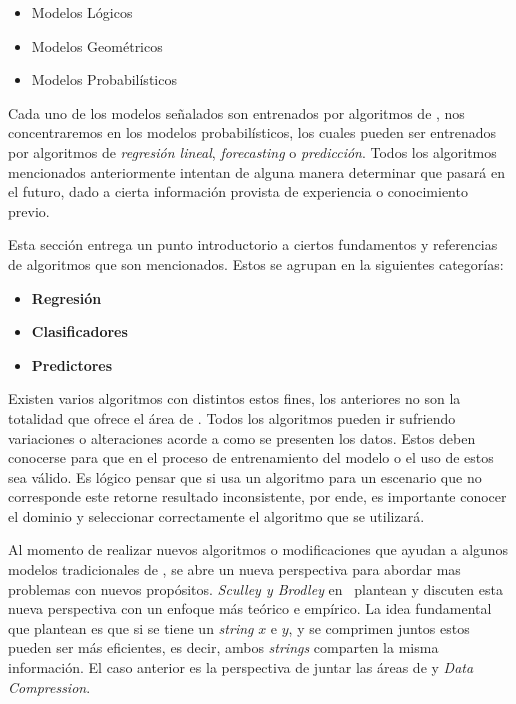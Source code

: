 \begin{itemize}
\menorEspacioItemize		
 \item Modelos Lógicos
 \item Modelos Geométricos
 \item Modelos Probabilísticos
\end{itemize} 

Cada uno de los modelos señalados son entrenados por algoritmos de \machinelearning, nos concentraremos en los modelos probabilísticos, los cuales pueden ser entrenados por algoritmos de \emph{regresión lineal}, \emph{forecasting} o \emph{predicción}. Todos los algoritmos mencionados anteriormente intentan de alguna manera determinar que pasará en el futuro, dado a cierta información provista de experiencia o conocimiento previo.

Esta sección entrega un punto introductorio a ciertos fundamentos y referencias de algoritmos que son mencionados. Estos se agrupan en la siguientes categorías:

\begin{itemize}
	\menorEspacioItemize
	\item \textbf{Regresión}
			
	\item \textbf{Clasificadores}	
			
	\item \textbf{Predictores}
			
\end{itemize}
 
\uncm


Existen varios algoritmos con distintos estos fines, los anteriores no son la totalidad que ofrece el área de  \machinelearning. Todos los algoritmos pueden ir sufriendo variaciones o alteraciones acorde a como se presenten los datos. Estos deben conocerse para que en el proceso de entrenamiento del  modelo o el uso de estos sea válido. Es lógico pensar que si usa un algoritmo para un escenario que no corresponde este retorne resultado inconsistente, por ende, es importante conocer el dominio y seleccionar correctamente el algoritmo que se utilizará.


Al momento de realizar nuevos algoritmos o modificaciones que ayudan a algunos modelos tradicionales de \machinelearning, se abre un nueva perspectiva para abordar mas problemas con nuevos propósitos. \emph{Sculley y Brodley} en~\cite{Sculley2006} plantean y discuten esta nueva perspectiva con un enfoque más teórico e empírico. La idea fundamental que plantean es que si se tiene un \emph{string} $x$ e $y$, y  se comprimen juntos estos pueden ser más eficientes, es decir,  ambos \emph{strings} comparten la misma información. El caso anterior es la perspectiva de juntar las áreas de \machinelearning y \emph{Data Compression}. 

